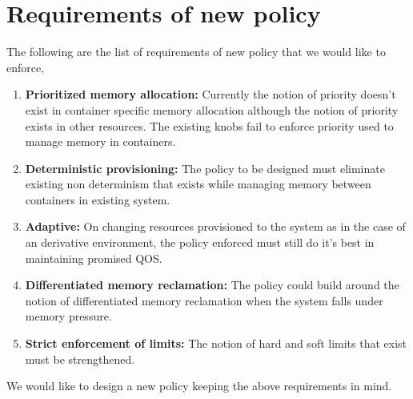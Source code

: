 
\chapter{Requirements of new policy}
  
  The following are the list of requirements of new policy that we would like to enforce,
  
    \begin{enumerate}
      \item \textbf{Prioritized memory allocation:} Currently the notion of priority doesn't exist in container specific memory allocation 
although the notion of priority exists in other resources. The existing knobs fail to enforce priority used to manage memory in containers. 
      \item \textbf{Deterministic provisioning:} The policy to be designed must eliminate existing non determinism that exists while 
managing memory between containers in existing system.
      \item \textbf{Adaptive:} On changing resources provisioned to the system as in the case of an derivative environment, the policy 
enforced must still do it's best in maintaining promised QOS.
      \item \textbf{Differentiated memory reclamation:} The policy could build around the notion of differentiated memory reclamation when 
the system falls under memory pressure.
      \item \textbf{Strict enforcement of limits:} The notion of hard and soft limits that exist must be strengthened.      
    \end{enumerate}
    
  We would like to design a new policy keeping the above requirements in mind.

